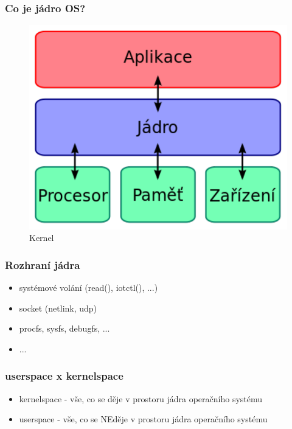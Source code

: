 \documentclass[professionalfonts,svgnames]{beamer}
\begin{document}
\begin{frame}
\frametitle{Co je jádro OS?}
\begin{figure}[h]
	\includegraphics[scale=0.4]{fig/kernel}
	\caption{Kernel}
	\label{kern}
\end{figure}
\end{frame}

\begin{frame}
\frametitle{Rozhraní jádra}
\begin{itemize} %
	\item systémové volání (read(), iotctl(), ...)
	\item socket (netlink, udp)
	\item procfs, sysfs, debugfs, ...
	\item ...
\end{itemize}
\end{frame}

\begin{frame}
\frametitle{userspace x kernelspace}
\begin{itemize} %
	\item kernelspace - vše, co se děje v prostoru jádra operačního systému
	\item userspace - vše, co se NEděje v prostoru jádra operačního systému
\end{itemize}
\end{frame}
\end{document}
